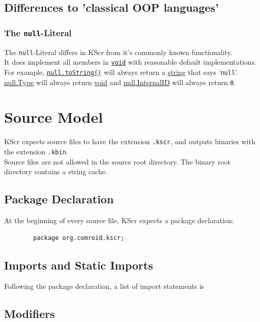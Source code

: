 \documentclass{docs}
\begin{document}
    \subsection{Differences to 'classical OOP languages'}

    \subsubsection{The \texttt{null}-Literal}
    The \texttt{null}-Literal differs in KScr from it's commonly known functionality. \\
    It does implement all members in \hyperref[typeVoid]{\texttt{void}} with reasonable default implementations.
    For example, \hyperref[methodVoidToString]{\texttt{null.toString()}} will always return a \hyperref[typeStr]{string} that says '\texttt{null}'.
    \hyperref[propVoidType]{null.Type} will always return \hyperref[typeVoid]{void} and \hyperref[propVoidInternalID]{null.InternalID} will always return \texttt{0}.

    \section{Source Model}
    KScr expects source files to have the extension \texttt{.kscr}, and outputs binaries with the extension \texttt{.kbin}.
    \\
    Source files are not allowed in the source root directory.
    The binary root directory contains a string cache.
    
    \subsection{Package Declaration}
    At the beginning of every source file, KScr expects a package declaration:
    \begin{verbatim}
        package org.comroid.kscr;
    \end{verbatim}

    \subsection{Imports and Static Imports}
    Following the package declaration, a list of import statements is 

    \subsection{Modifiers}
    
\end{document}
